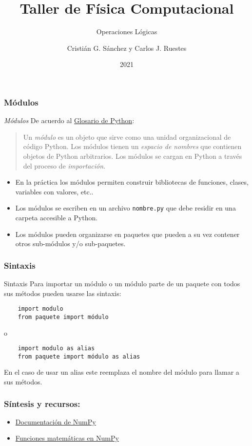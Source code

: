 \documentclass{beamer}
\title{Taller de Física Computacional}
\subtitle{Operaciones Lógicas}
\author{Cristián G. Sánchez y Carlos J. Ruestes}
\date{2021}
\begin{document}
\frame{\titlepage}

\begin{frame}[fragile]
    \frametitle{Módulos}
    \begin{block}{{\em Módulos}}
    De acuerdo al \href{https://docs.python.org/3/glossary.html}{Glosario de Python}:
    \begin{quote}
    Un {\em módulo} es un objeto que sirve como una unidad organizacional de código Python. Los módulos tienen un {\em espacio de nombres} que contienen objetos de Python arbitrarios. Los módulos se cargan en Python a través del proceso de {\em importación}.
    \end{quote}
    \end{block}
    \begin{itemize}
    \item En la práctica los módulos permiten construir bibliotecas de funciones, clases, variables con valores, etc..
    \item Los módulos se escriben en un archivo {\tt nombre.py} que debe residir en una carpeta accesible a Python.
    \item Los módulos pueden organizarse en paquetes que pueden a su vez contener otros sub-módulos y/o sub-paquetes.
    \end{itemize}
    
    \end{frame}

\begin{frame}[fragile]
    \frametitle{Sintaxis}
    \begin{block}{Sintaxis}
    Para importar un módulo o un módulo parte de un paquete con todos sus métodos pueden usarse las sintaxis:
    \begin{verbatim}
    import modulo 
    from paquete import módulo
    \end{verbatim}
    o
    \begin{verbatim}
    import modulo as alias
    from paquete import módulo as alias
    \end{verbatim}
    En el caso de usar un alias este reemplaza el nombre del módulo para llamar a sus métodos.
    \end{block}
    \end{frame}

\begin{frame}
\frametitle{Síntesis y recursos:}

\begin{itemize}
\item \href{https://numpy.org/doc/stable/}{Documentación de NumPy}
\item \href{https://numpy.org/doc/stable/reference/routines.math.html}{Funciones matemáticas en NumPy}

\end{itemize}
\end{frame}
\end{document}
